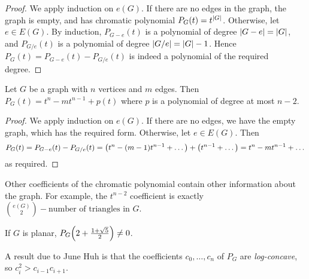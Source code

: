 \begin{proof}
	We apply induction on \( e(G) \).
	If there are no edges in the graph, the graph is empty, and has chromatic polynomial \( P_G(t) = t^{\abs{G}} \).
	Otherwise, let \( e \in E(G) \).
	By induction, \( P_{G - e}(t) \) is a polynomial of degree \( \abs{G - e} = \abs{G} \), and \( P_{G / e}(t) \) is a polynomial of degree \( \abs{G / e} = \abs{G} - 1 \).
	Hence \( P_G(t) = P_{G - e}(t) - P_{G / e}(t) \) is indeed a polynomial of the required degree.
\end{proof}
\begin{proposition}
	Let \( G \) be a graph with \( n \) vertices and \( m \) edges.
	Then \( P_G(t) = t^n - mt^{n-1} + p(t) \) where \( p \) is a polynomial of degree at most \( n - 2 \).
\end{proposition}
\begin{proof}
	We apply induction on \( e(G) \).
	If there are no edges, we have the empty graph, which has the required form.
	Otherwise, let \( e \in E(G) \).
	Then
	\[ P_G(t) = P_{G - e}(t) - P_{G/e}(t) = \qty(t^n - (m - 1)t^{n-1} + \dots) + \qty(t^{n-1} + \dots) = t^n - mt^{n-1} + \dots \]
	as required.
\end{proof}
\begin{remark}
	Other coefficients of the chromatic polynomial contain other information about the graph.
	For example, the \( t^{n-2} \) coefficient is exactly \( \binom{e(G)}{2} - \text{number of triangles in } G \).

	If \( G \) is planar, \( P_G\qty(2+\frac{1+\sqrt{5}}{2}) \neq 0 \).

	A result due to June Huh is that the coefficients \( c_0, \dots, c_n \) of \( P_G \) are \emph{log-concave}, so \( c_i^2 > c_{i-1}c_{i+1} \).
\end{remark}

